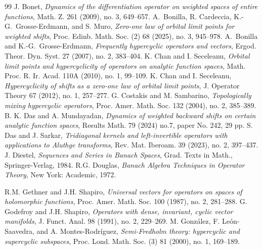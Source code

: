 \documentclass[12pt, reqno]{amsart}
\theoremstyle{definition}
\theoremstyle{remark}
\numberwithin{equation}{section}
\begin{document}
\begin{thebibliography}{99}
 J. Bonet, \textit{Dynamics of the differentiation operator on weighted spaces of entire functions}, Math. Z. 261 (2009), no. 3, 649–657.
 A.\ Bonilla, R. Cardeccia, K.-G.\ Grosse-Erdmann, and S. Muro, \textit{Zero-one law of orbital limit points for weighted shifts}, Proc. Edinb. Math. Soc. (2) 68 (2025), no. 3, 945–978.
 A.\ Bonilla and K.-G.\ Grosse-Erdmann,
\textit{Frequently hypercyclic operators and vectors}, Ergod. Theor. Dyn. Syst. 27 (2007), no. 2, 383–404.
 K. Chan and I. Seceleanu, \textit{Orbital limit points and hypercyclicity of operators on analytic function spaces}, Math. Proc. R. Ir. Acad. 110A (2010), no. 1, 99–109.
 K. Chan and I. Seceleanu, \textit{Hypercyclicity of shifts as a zero-one law of orbital limit points}, J. Operator Theory 67 (2012), no. 1, 257–277.
 G. Costakis and M. Sambarino, \textit{Topologically mixing hypercyclic operators}, Proc. Amer. Math. Soc. 132 (2004), no. 2, 385–389. 
 B. K. Das and A. Mundayadan, \textit{Dynamics of weighted backward shifts on certain analytic function spaces}, Results Math. 79 (2024) no.7, paper No. 242, 29 pp.
 S. Das and J. Sarkar, \textit{Tridiagonal kernels and left-invertible operators with applications to Aluthge transforms}, Rev. Mat. Iberoam. 39 (2023), no. 2, 397–437.
 J. Diestel, \textit{Sequences and Series in Banach Spaces}, Grad. Texts in Math., Springer-Verlag, 1984.
 R.G. Douglas, \textit{Banach Algebra Techniques in Operator Theory}, New York: Academic, 1972.

 R.M. Gethner and J.H. Shapiro, \textit{Universal vectors for operators on spaces of holomorphic functions}, Proc. Amer. Math. Soc. 100 (1987), no. 2, 281–288. 
 G. Godefroy and J.H. Shapiro, \textit{Operators with dense,
invariant, cyclic vector manifolds}, J. Funct. Anal. 98 (1991), no. 2, 229–269.
 M. Gonz\'{a}lez, F. Le\'{o}n-Saavedra, and A. Montes-Rodr\'{i}guez, \textit{Semi-Fredholm theory: hypercyclic and supercyclic subspaces}, Proc. Lond. Math. Soc. (3) 81 (2000), no. 1, 169–189. 


\end{thebibliography}
\end{document}
